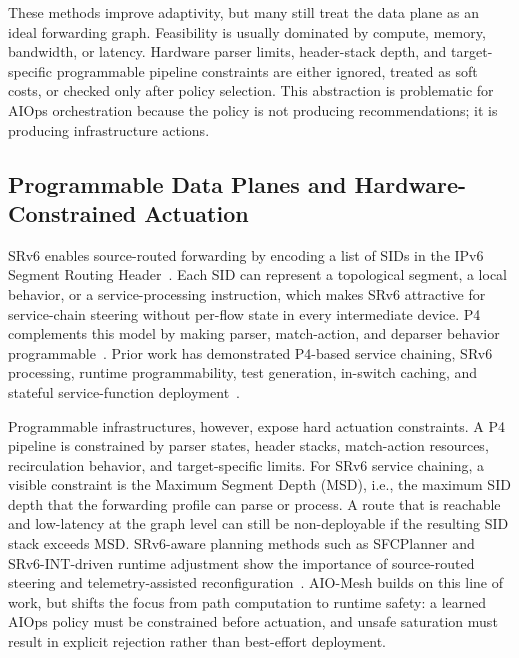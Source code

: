 \documentclass[final,5p]{elsarticle}
\begin{document}
These methods improve adaptivity, but many still treat the data plane as an ideal forwarding graph. Feasibility is usually dominated by compute, memory, bandwidth, or latency. Hardware parser limits, header-stack depth, and target-specific programmable pipeline constraints are either ignored, treated as soft costs, or checked only after policy selection. This abstraction is problematic for AIOps orchestration because the policy is not producing recommendations; it is producing infrastructure actions.

\subsection{Programmable Data Planes and Hardware-Constrained Actuation}
\label{subsec:related_pdp}

SRv6 enables source-routed forwarding by encoding a list of SIDs in the IPv6 Segment Routing Header~\cite{filsfils2015segment,rfc8986,rfc9352}. Each SID can represent a topological segment, a local behavior, or a service-processing instruction, which makes SRv6 attractive for service-chain steering without per-flow state in every intermediate device. P4 complements this model by making parser, match-action, and deparser behavior programmable~\cite{jeyakumar2014p4}. Prior work has demonstrated P4-based service chaining, SRv6 processing, runtime programmability, test generation, in-switch caching, and stateful service-function deployment~\cite{stockmayer2020p4sfc,xiang2019p4sc,yang2024p4runpro,ruffy2023p4testgen,zhao2023p4lru,ma2024sfcache,li2024stsfc}.

Programmable infrastructures, however, expose hard actuation constraints. A P4 pipeline is constrained by parser states, header stacks, match-action resources, recirculation behavior, and target-specific limits. For SRv6 service chaining, a visible constraint is the Maximum Segment Depth (MSD), i.e., the maximum SID depth that the forwarding profile can parse or process. A route that is reachable and low-latency at the graph level can still be non-deployable if the resulting SID stack exceeds MSD. SRv6-aware planning methods such as SFCPlanner and SRv6-INT-driven runtime adjustment show the importance of source-routed steering and telemetry-assisted reconfiguration~\cite{qiu2024sfcplanner,yan2024srv6int}. AIO-Mesh builds on this line of work, but shifts the focus from path computation to runtime safety: a learned AIOps policy must be constrained before actuation, and unsafe saturation must result in explicit rejection rather than best-effort deployment.
\end{document}
